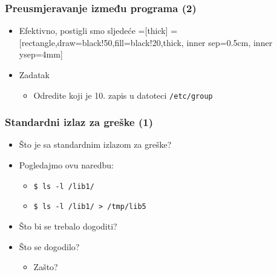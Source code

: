 \documentclass{beamer}
\newcommand{\shell}[1]{\texttt{#1}}
\begin{document}
\begin{frame}[t]
\frametitle{Preusmjeravanje između programa (2)}
\begin{itemize}
  \item Efektivno, postigli smo sljedeće
  \vspace{1cm}
  =[thick]
  =[rectangle,draw=black!50,fill=black!20,thick,
                     inner sep=0.5cm, inner ysep=4mm]
  \vspace{1cm}
  \item Zadatak
  \begin{itemize}
    \item Odredite koji je 10. zapis u datoteci \shell{/etc/group}
  \end{itemize}
\end{itemize}
\end{frame}

\begin{frame}[t]
\frametitle{Standardni izlaz za greške (1)}
\begin{itemize}
  \item Što je sa standardnim izlazom za greške?
  \item Pogledajmo ovu naredbu:
  \begin{itemize}
    \item[] \shell{\$ ls -l /lib1/}
    \item[] \shell{\$ ls -l /lib1/ > /tmp/lib5}
  \end{itemize}
  \item Što bi se trebalo dogoditi?
  \item Što se dogodilo?
  \begin{itemize}
    \item Zašto?
  \end{itemize}
\end{itemize}
\end{frame}
\end{document}
